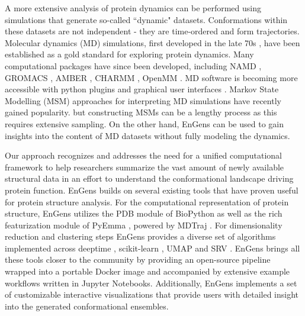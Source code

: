 \documentclass[numsec,webpdf,contemporary,large]{oup-authoring-template}
\theoremstyle{thmstyleone}%
\theoremstyle{thmstyletwo}%
\theoremstyle{thmstylethree}%
\begin{document}
A more extensive analysis of protein dynamics can be performed using simulations that generate so-called ``dynamic" datasets. Conformations within these datasets are not independent - they are time-ordered and form trajectories. Molecular dynamics (MD) simulations, first developed in the late 70s \citep{warshel_theoretical_1976}, have been established as a gold standard for exploring protein dynamics. Many computational packages have since been developed, including NAMD \citep{phillips_scalable_2020}, GROMACS \citep{bekker_gromacs_1993, berendsen_gromacs_1995}, AMBER \citep{salomon-ferrer_overview_2013}, CHARMM \citep{brooks_charmm_2009}, OpenMM \citep{eastman_openmm_2017}. MD software is becoming more accessible with python plugins and graphical user interfaces \citep{barhaghi_py-mcmd_2022}. Markov State Modelling (MSM) approaches for interpreting MD simulations \citep{prinz_markov_2011} have recently gained popularity. but constructing MSMs can be a lengthy process as this requires extensive sampling. On the other hand, EnGens can be used to gain insights into the content of MD datasets without fully modeling the dynamics.

Our approach recognizes and addresses the need for a unified computational framework to help researchers summarize the vast amount of newly available structural data in an effort to understand the conformational landscape driving protein function. EnGens builds on several existing tools that have proven useful for protein structure analysis. For the computational representation of protein structure, EnGens utilizes the PDB module of BioPython \citep{cock_biopython_2009} as well as the rich featurization module of PyEmma \citep{scherer_pyemma_2015}, powered by MDTraj \citep{mcgibbon_mdtraj_2015}. For dimensionality reduction and clustering steps EnGens provides a diverse set of algorithms implemented across deeptime \citep{hoffmann_deeptime_2021}, scikit-learn \citep{pedregosa_scikit-learn_2011}, UMAP \citep{trozzi_umap_2021} and SRV \citep{chen_nonlinear_2019}. EnGens brings all these tools closer to the community by providing an open-source pipeline wrapped into a portable Docker image and accompanied by extensive example workflows written in Jupyter Notebooks. Additionally, EnGens implements a set of customizable interactive visualizations that provide users with detailed insight into the generated conformational ensembles. 
\end{document}

